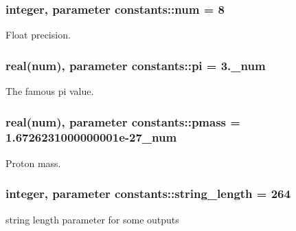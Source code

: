 \subsubsection[{\texorpdfstring{num}{num}}]{\setlength{\rightskip}{0pt plus 5cm}integer, parameter constants\+::num = 8}\hypertarget{namespaceconstants_afe19f7f8af171411c51fb763b36e3823}{}\label{namespaceconstants_afe19f7f8af171411c51fb763b36e3823}


Float precision. 

\subsubsection[{\texorpdfstring{pi}{pi}}]{\setlength{\rightskip}{0pt plus 5cm}real({\bf num}), parameter constants\+::pi = 3.\+\_\+num}\hypertarget{namespaceconstants_a736c2860cb0585043ad4abcd1c3352b1}{}\label{namespaceconstants_a736c2860cb0585043ad4abcd1c3352b1}


The famous pi value. 

\subsubsection[{\texorpdfstring{pmass}{pmass}}]{\setlength{\rightskip}{0pt plus 5cm}real({\bf num}), parameter constants\+::pmass = 1.\+6726231000000001e-\/27\+\_\+num}\hypertarget{namespaceconstants_a44f3d8cbf9c39db63d7533d985cc51c3}{}\label{namespaceconstants_a44f3d8cbf9c39db63d7533d985cc51c3}


Proton mass. 

\subsubsection[{\texorpdfstring{string\+\_\+length}{string_length}}]{\setlength{\rightskip}{0pt plus 5cm}integer, parameter constants\+::string\+\_\+length = 264}\hypertarget{namespaceconstants_a6082bfa433cfb27d3f80d0f32b278570}{}\label{namespaceconstants_a6082bfa433cfb27d3f80d0f32b278570}


string length parameter for some outputs 

